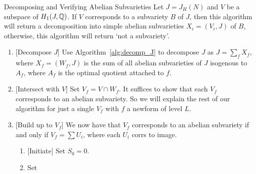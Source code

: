 \begin{algorithm}{Decomposing and Verifying Abelian Subvarieties}
    \label{alg:decomp_and_verify_subvarieties}
    Let $J=J_H(N)$ and $V$ be a subspace of $H_1(J, \mathbb{Q})$. If $V$ corresponds
    to a subvariety $B$ of $J$, then this algorithm will return a decomposition
    into simple abelian subvarieties $X_i=(V_i, J)$ of $B$, otherwise, this
    algorithm will return `not a subvariety'.
    \begin{enumerate}
        \item{} [Decompose $J$]
            Use Algorithm~\ref{alg:decomp_J} to decompose $J$ as $J=\sum_f
            X_f$, where $X_f=(W_f, J)$ is the sum of all abelian subvarieties
            of $J$ isogenous to $A_f$, where $A_f$ is the optimal quotient
            attached to $f$.
        \item{} [Intersect with $V$]
            Set $V_f=V\cap W_f$. It suffices to show that each $V_f$
            corresponds to an abelian subvariety. So we will explain the rest
            of our algorithm for just a single $V_f$ with $f$ a newform of
            level $L$.
        \item{} [Build up to $V_f$]
            We now have that $V_f$ corresponds to an abelian subvariety if and
            only if $V_f=\sum U_i$, where each $U_i$ corrs to image.
            \begin{enumerate}
                \item{} [Initiate]
                    Set $S_0=0$.
                \item
                    Set
            \end{enumerate}
    \end{enumerate}
\end{algorithm}

